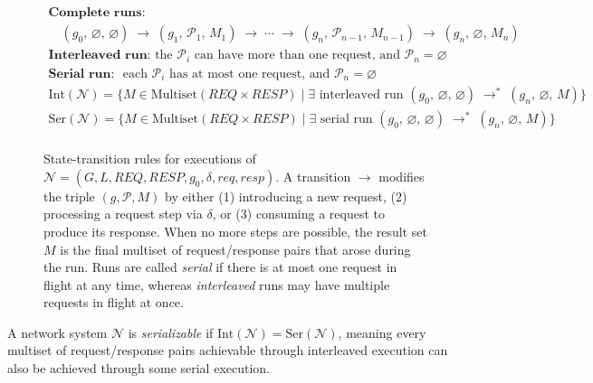 \begin{figure}[t]
    \[
    \begin{array}{c}
    \textbf{Complete runs:}
    \\
    \quad (g_0,\,\varnothing,\,\varnothing) \;\longrightarrow\; (g_1,\,\mathcal{P}_1,\,M_1) \;\longrightarrow\; \cdots \;\longrightarrow\; (g_n,\,\mathcal{P}_{n-1},\,M_{n-1}) \;\longrightarrow\; (g_n,\,\varnothing,\,M_n)
    \\[1em]
    \textbf{Interleaved run: } \text{the } \mathcal{P}_i \text{ can have more than one request, and } \mathcal{P}_n = \varnothing \\
    \textbf{Serial run: } \text{ each } \mathcal{P}_i \text{ has at most one request, and } \mathcal{P}_n = \varnothing\\
    \text{Int}(\mathcal{N}) = \{ M \in \text{Multiset}(\mathit{REQ} \times \mathit{RESP}) \mid \exists \text{ interleaved run } (g_0,\,\varnothing,\,\varnothing) \;\longrightarrow^*\; (g_n,\,\varnothing,\,M) \}\\
    \text{Ser}(\mathcal{N}) = \{ M \in \text{Multiset}(\mathit{REQ} \times \mathit{RESP}) \mid \exists \text{ serial run } (g_0,\,\varnothing,\,\varnothing) \;\longrightarrow^*\; (g_n,\,\varnothing,\,M) \}\\
    \end{array}
    \]

    \caption{State-transition rules for executions of
    \(\mathcal{N} = (G, L, \mathit{REQ}, \mathit{RESP}, g_0, \delta, \mathit{req}, \mathit{resp})\).
    A transition \(\longrightarrow\) modifies the triple \((g,\mathcal{P}, M)\) by either (1) introducing a new request, (2) processing a request step via \(\delta\), or (3) consuming a request to produce its response.  When no more steps are possible, the result set \(M\) is the final multiset of request/response pairs that arose during the run.
    Runs are called \emph{serial} if there is at most one request in flight at any time, whereas \emph{interleaved} runs may have multiple requests in flight at once.}
    \label{fig:network-transitions}
\end{figure}

\begin{definition}[Serializability]
A network system $\mathcal{N}$ is \emph{serializable} if $\text{Int}(\mathcal{N}) = \text{Ser}(\mathcal{N})$, meaning every multiset of request/response pairs achievable through interleaved execution can also be achieved through some serial execution.
\end{definition}


